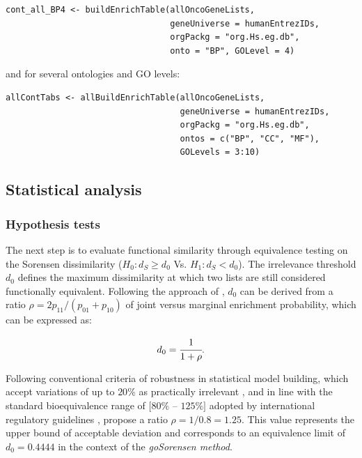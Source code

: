 \begin{verbatim}
cont_all_BP4 <- buildEnrichTable(allOncoGeneLists,
                                 geneUniverse = humanEntrezIDs, 
                                 orgPackg = "org.Hs.eg.db", 
                                 onto = "BP", GOLevel = 4)
\end{verbatim}

and for several ontologies and GO levels:

\begin{verbatim}
allContTabs <- allBuildEnrichTable(allOncoGeneLists,
                                   geneUniverse = humanEntrezIDs, 
                                   orgPackg = "org.Hs.eg.db", 
                                   ontos = c("BP", "CC", "MF"), 
                                   GOLevels = 3:10)
\end{verbatim}

\subsection{Statistical analysis}\label{statistical-analysis}

\subsubsection{Hypothesis tests}\label{hypothesis-tests}

The next step is to evaluate functional similarity through equivalence testing on the Sorensen dissimilarity (\(H_0: d_S \geq d_0\) Vs. \(H_1: d_S < d_0\)). The irrelevance threshold \(d_0\) defines the maximum dissimilarity at which two lists are still considered functionally equivalent. Following the approach of \citet{flores2022equivalence}, \(d_0\) can be derived from a ratio \(\rho = 2p_{11}/(p_{01}+p_{10})\) of joint versus marginal enrichment probability, which can be expressed as:

\[
d_0 = \cfrac{1}{1+\rho}.
\]

Following conventional criteria of robustness in statistical model building, which accept variations of up to \(20\%\) as practically irrelevant \citep{box1979robustness}, and in line with the standard bioequivalence range of \([80\%\) \(–\) \(125\%]\) adopted by international regulatory guidelines \citep{food1992guidance, europeanguidance}, \citet{flores2022equivalence} propose a ratio \(\rho = 1/0.8=1.25\). This value represents the upper bound of acceptable deviation and corresponds to an equivalence limit of \(d_0=0.4444\) in the context of the \emph{goSorensen method}.

